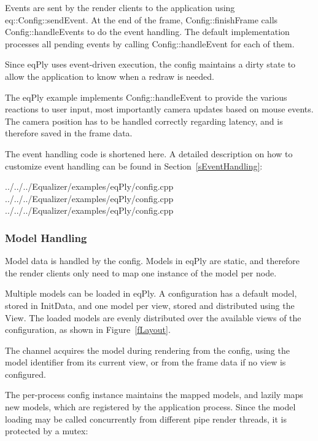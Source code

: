 \documentclass[10pt,a4]{scrartcl}
\newcommand{\fig}[1]{Figure~\ref{#1}}
\newcommand{\sref}[1]{Section~\ref{#1}}
\begin{document}
Events are sent by the render clients to the application using
\textsf{eq::Config::sendEvent}. At the end of the frame,
\textsf{Config::finishFrame} calls \textsf{Config::handleEvents} to do
the event handling. The default implementation processes all pending
events by calling \textsf{Config::handleEvent} for each of them.

Since \textsf{eqPly} uses event-driven execution, the config maintains a
dirty state to allow the application to know when a redraw is needed.

The \textsf{eqPly} example implements \textsf{Config::hand\-le\-Event}
to provide the various reactions to user input, most importantly camera
updates based on mouse events. The camera position has to be handled
correctly regarding latency, and is therefore saved in the frame data.

The event handling code is shortened here. A detailed description on how to
customize event handling can be found in \sref{sEventHandling}:

{\footnotesize
  {../../../Equalizer/examples/eqPly/config.cpp}}
{\footnotesize
  {../../../Equalizer/examples/eqPly/config.cpp}}
{\footnotesize
  {../../../Equalizer/examples/eqPly/config.cpp}}


\subsubsection{Model Handling}

Model data is handled by the config. Models in eqPly are static,
and therefore the render clients only need to map one instance of the
model per node.

Multiple models can be loaded in \textsf{eqPly}. A configuration has a default
model, stored in \textsf{InitData}, and one model per view, stored and
distributed using the \textsf{View}. The loaded models are evenly distributed
over the available views of the configuration, as shown in \fig{fLayout}.

The channel acquires the model during rendering from the config, using
the model identifier from its current view, or from the frame data if
no view is configured.

The per-process config instance maintains the mapped models, and lazily maps new
models, which are registered by the application process. Since the model loading
may be called concurrently from different pipe render threads, it is protected
by a \textsf{mutex}:
\end{document}
